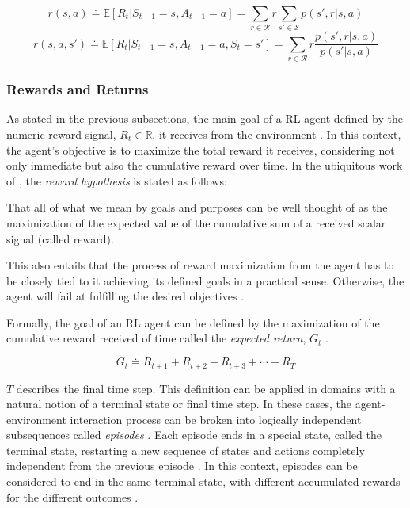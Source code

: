 \documentclass[11pt,a4paper]{article}
\begin{document}
\begin{equation} \label{eq:mpd-reward-sa}
    r(s,a) \doteq \mathbb{E}[R_t | S_{t-1} = s, A_{t-1} = a] = \sum_{r \in \mathcal{R}} r \sum_{s' \in \mathcal{S}} p(s', r|s,a)
\end{equation}
\begin{equation} \label{eq:mpd-reward-sas'}
    r(s,a,s') \doteq \mathbb{E}[R_t | S_{t-1} = s, A_{t-1} = a, S_t = s'] = \sum_{r \in \mathcal{R}} r \frac{p(s',r|s,a)}{p(s'|s,a)}
\end{equation}

\subsubsection{Rewards and Returns}

As stated in the previous subsections, the main goal of a \ac{RL} agent defined by the numeric reward signal, $R_t \in \mathbb{R}$, it receives from the environment \cite{suttonReinforcementLearningIntroduction2014}. In this context, the agent's objective is to maximize the total reward it receives, considering not only immediate but also the cumulative reward over time. In the ubiquitous work of \cite{suttonReinforcementLearningIntroduction2014}, the \textit{reward hypothesis} is stated as follows:

\begin{displayquote}
That all of what we mean by goals and purposes can be well thought of as the maximization of the expected value of the cumulative sum of a received scalar signal (called reward). \cite{suttonReinforcementLearningIntroduction2014}
\end{displayquote}
This also entails that the process of reward maximization from the agent has to be closely tied to it achieving its defined goals in a practical sense. Otherwise, the agent will fail at fulfilling the desired objectives \cite{suttonReinforcementLearningIntroduction2014}.

Formally, the goal of an \ac{RL} agent can be defined by the maximization of the cumulative reward received of time called the \textit{expected return}, $G_t$ \cite{suttonReinforcementLearningIntroduction2014}.

\begin{equation} \label{eq:expected-return}
    G_t \doteq R_{t+1} + R_{t+2} + R_{t+3} + \cdots + R_T
\end{equation}

$T$ describes the final time step. This definition can be applied in domains with a natural notion of a terminal state or final time step. In these cases, the agent-environment interaction process can be broken into logically independent subsequences called \textit{episodes} \cite{suttonReinforcementLearningIntroduction2014}. Each episode ends in a special state, called the terminal state, restarting a new sequence of states and actions completely independent from the previous episode \cite{suttonReinforcementLearningIntroduction2014}. In this context, episodes can be considered to end in the same terminal state, with different accumulated rewards for the different outcomes \cite{suttonReinforcementLearningIntroduction2014}.
\end{document}

